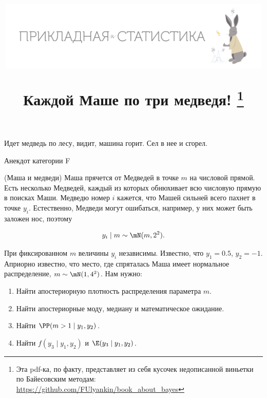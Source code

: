 \documentclass[12pt, a4paper, oneside]{article}
\title{\begin{center} \includegraphics[width=0.99\textwidth]{logo.png} \end{center}  Каждой Маше по три медведя! \footnote{Эта pdf-ка, по факту, представляет из себя кусочек недописанной виньетки по Байесовским методам: \newline  \url{https://github.com/FUlyankin/book_about_bayes}}}
\begin{document}
	
	\maketitle
	
\epigraph{Идет медведь по лесу, видит, машина горит. Сел в нее и сгорел.}{Анекдот категории F}
	
\begin{problem}{(Маша и медведи)}
Маша прячется от Медведей в точке $m$ на числовой прямой. Есть несколько Медведей, каждый из которых обнюхивает всю числовую прямую в поисках Маши. Медведю номер $i$ кажется, что Машей сильней всего пахнет в точке $y_i$. Естественно, Медведи могут ошибаться, например, у них может быть заложен нос, поэтому 

\[ y_i \mid m \sim \mN(m, 2^2).\]

При фиксированном $m$ величины $y_i$  независимы. Известно, что $y_1 = 0.5$, $y_2 = −1$.  Априорно известно, что место, где спряталась Маша имеет нормальное распределение, $m \sim \mN(1, 4^2)$. Нам нужно:

\begin{enumerate}
	\item Найти апостериорную плотность распределения параметра $m$.
	\item Найти апостериорные моду, медиану и математическое ожидание.
	\item Найти $\PP(m > 1 \mid y_1,y_2)$.
	\item Найти $f(y_3 \mid y_1,y_2)$ и $\E(y_3 \mid y_1,y_2)$.
\end{enumerate}
\end{problem}
\end{document}
